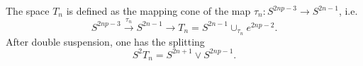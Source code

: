 The space $T_n$ is defined as the mapping cone of the map $\tau_n \colon S^{2np-3} \to S^{2n-1}$, i.e.
$$S^{2np-3} \xrightarrow{\tau_n} S^{2n-1} \longrightarrow T_n = S^{2n-1} \cup_{\tau_n} e^{2np-2}.$$
After double suspension, one has the splitting
$$S^2 T_n = S^{2n+1} \vee S^{2np-1}.$$
